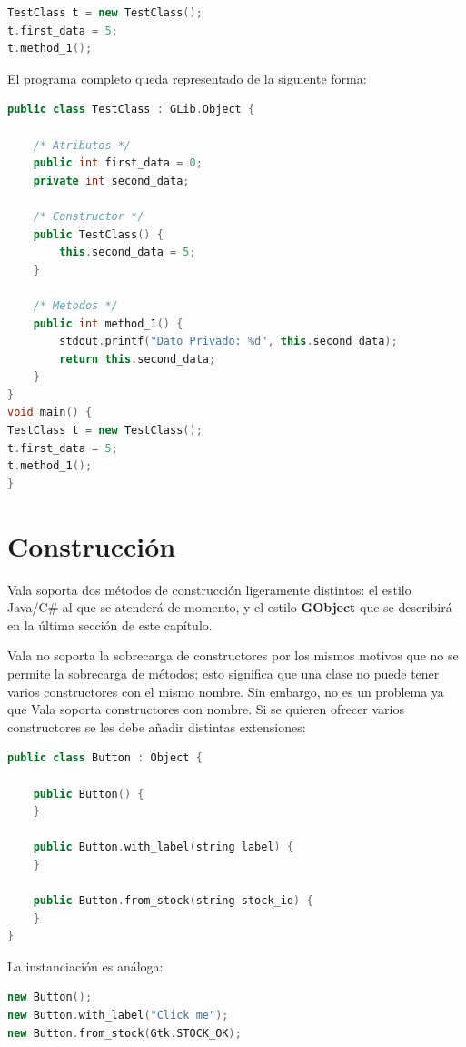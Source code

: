 \documentclass[12pt,twoside]{book}
\begin{document}
\begin{lstlisting}[language=C++]
TestClass t = new TestClass();
t.first_data = 5;
t.method_1();
\end{lstlisting}

El programa completo queda representado de la siguiente forma:

\begin{lstlisting}[language=C++]
public class TestClass : GLib.Object {
	
	/* Atributos */
	public int first_data = 0;
	private int second_data;
	
	/* Constructor */
	public TestClass() {
		this.second_data = 5;
	}
	
	/* Metodos */
	public int method_1() {
		stdout.printf("Dato Privado: %d", this.second_data);
		return this.second_data;
	}
}
void main() {
TestClass t = new TestClass();
t.first_data = 5;
t.method_1();
}
\end{lstlisting}


\section{Construcción}

Vala soporta dos métodos de construcción ligeramente distintos: el estilo Java/C\# al que se atenderá de momento, y el estilo \textbf{GObject} que se describirá en la última sección de este capítulo.

Vala no soporta la sobrecarga de constructores por los mismos motivos que no se permite la sobrecarga de métodos; esto significa que una clase no puede tener varios constructores con el mismo nombre. Sin embargo, no es un problema ya que Vala soporta constructores con nombre. Si se quieren ofrecer varios constructores se les debe añadir distintas extensiones:

\begin{lstlisting}[language=C++]
public class Button : Object {
	
	public Button() {
	}
	
	public Button.with_label(string label) {
	}
	
	public Button.from_stock(string stock_id) {
	}
}
\end{lstlisting}


La instanciación es análoga:

\begin{lstlisting}[language=C++]
new Button();
new Button.with_label("Click me");
new Button.from_stock(Gtk.STOCK_OK);
\end{lstlisting}
\end{document}
